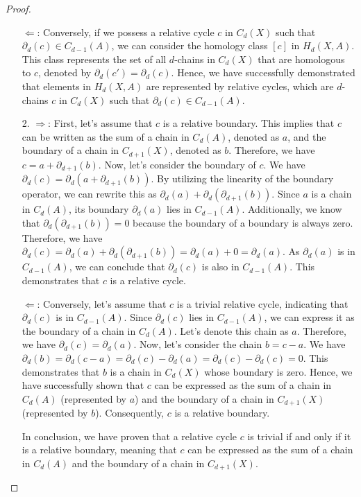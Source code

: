 \documentclass{amsart}
\begin{document}
\begin{proof}
\begin{enumerate}
	\glqq $\Leftarrow$\grqq{}: Conversely, if we possess a relative cycle $c$ in $C_d(X)$ such that $\partial_d(c) \in C_{d-1}(A)$, we can consider the homology class $[c]$ in $H_d(X,A)$. This class represents the set of all $d$-chains in $C_d(X)$ that are homologous to $c$, denoted by $\partial_d(c') = \partial_d(c)$. Hence, we have successfully demonstrated that elements in $H_d(X,A)$ are represented by relative cycles, which are $d$-chains $c$ in $C_d(X)$ such that $\partial_d(c) \in C_{d-1}(A)$.
	\item[2.] \glqq $\Rightarrow$\grqq{}: First, let's assume that $c$ is a relative boundary. This implies that $c$ can be written as the sum of a chain in $C_d(A)$, denoted as $a$, and the boundary of a chain in $C_{d+1}(X)$, denoted as $b$. Therefore, we have $c = a + \partial_{d+1}(b)$. Now, let's consider the boundary of $c$. We have $\partial_d(c) = \partial_d(a + \partial_{d+1}(b))$. By utilizing the linearity of the boundary operator, we can rewrite this as $\partial_d(a) + \partial_d(\partial_{d+1}(b))$. Since $a$ is a chain in $C_d(A)$, its boundary $\partial_d(a)$ lies in $C_{d-1}(A)$. Additionally, we know that $\partial_d(\partial_{d+1}(b)) = 0$ because the boundary of a boundary is always zero. Therefore, we have $\partial_d(c) = \partial_d(a) + \partial_d(\partial_{d+1}(b)) = \partial_d(a) + 0 = \partial_d(a)$. As $\partial_d(a)$ is in $C_{d-1}(A)$, we can conclude that $\partial_d(c)$ is also in $C_{d-1}(A)$. This demonstrates that $c$ is a relative cycle.

	\glqq $\Leftarrow$\grqq{}: Conversely, let's assume that $c$ is a trivial relative cycle, indicating that $\partial_d(c)$ is in $C_{d-1}(A)$. Since $\partial_d(c)$ lies in $C_{d-1}(A)$, we can express it as the boundary of a chain in $C_d(A)$. Let's denote this chain as $a$. Therefore, we have $\partial_d(c) = \partial_d(a)$. Now, let's consider the chain $b = c - a$. We have $\partial_d(b) = \partial_d(c - a) = \partial_d(c) - \partial_d(a) = \partial_d(c) - \partial_d(c) = 0$. This demonstrates that $b$ is a chain in $C_d(X)$ whose boundary is zero. Hence, we have successfully shown that $c$ can be expressed as the sum of a chain in $C_d(A)$ (represented by $a$) and the boundary of a chain in $C_{d+1}(X)$ (represented by $b$). Consequently, $c$ is a relative boundary.

	In conclusion, we have proven that a relative cycle $c$ is trivial if and only if it is a relative boundary, meaning that $c$ can be expressed as the sum of a chain in $C_d(A)$ and the boundary of a chain in $C_{d+1}(X)$.
\end{enumerate}
\end{proof}
\end{document}
